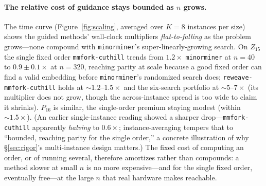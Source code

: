 \documentclass[acmsmall,anonymous,nonacm]{acmart}
\begin{document}
\paragraph{The relative cost of guidance stays bounded as $n$ grows.} The time curve
(Figure~\ref{fig:scaling}, averaged over $K{=}8$ instances per size) shows the guided
methods' wall-clock multipliers \emph{flat-to-falling} as the problem grows---none
compound with \texttt{minorminer}'s super-linearly-growing search. On $Z_{15}$ the
single fixed order \texttt{mmfork-cuthill} trends from $1.2\times$ \texttt{minorminer}
at $n{=}40$ to $0.9{\pm}0.1\times$ at $n{=}320$, reaching parity at scale because a
good fixed order can find a valid embedding before \texttt{minorminer}'s randomized
search does; \texttt{reweave-mmfork-cuthill} holds at ${\sim}1.2$--$1.5\times$ and the
six-search portfolio at ${\sim}5$--$7\times$ (its multiplier does not grow, though the
across-instance spread is too wide to claim it shrinks). $P_{16}$ is similar, the
single-order premium staying modest (within ${\sim}1.5\times$). (An earlier single-instance
reading showed a sharper drop---\texttt{mmfork-cuthill} apparently \emph{halving} to
$0.6\times$; instance-averaging tempers that to ``bounded, reaching parity for the
single order,'' a concrete illustration of why \S\ref{sec:rigor}'s multi-instance
design matters.) The fixed cost of computing an order, or of running several,
therefore amortizes rather than compounds: a method slower at small $n$ is no more
expensive---and for the single fixed order, eventually free---at the large $n$ that
real hardware makes reachable.
\end{document}
